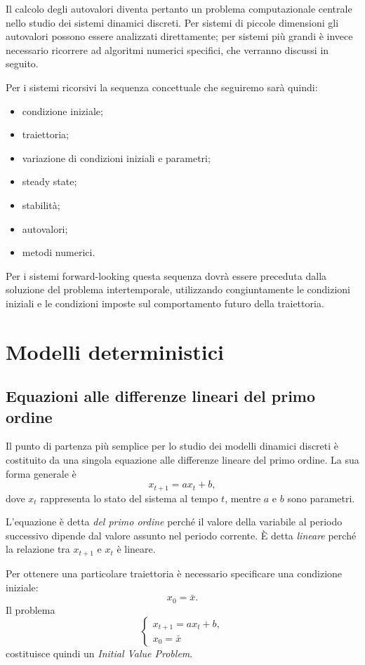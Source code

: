 \documentclass{book}
\begin{document}
Il calcolo degli autovalori diventa pertanto un problema
computazionale centrale nello studio dei sistemi dinamici discreti.
Per sistemi di piccole dimensioni gli autovalori possono essere
analizzati direttamente; per sistemi più grandi è invece necessario
ricorrere ad algoritmi numerici specifici, che verranno discussi in
seguito.

Per i sistemi ricorsivi la sequenza concettuale che seguiremo sarà
quindi:
\begin{itemize}
    \item condizione iniziale;
    \item traiettoria;
    \item variazione di condizioni iniziali e parametri;
    \item steady state;
    \item stabilità;
    \item autovalori;
    \item metodi numerici.
\end{itemize}

Per i sistemi forward-looking questa sequenza dovrà essere preceduta
dalla soluzione del problema intertemporale, utilizzando congiuntamente
le condizioni iniziali e le condizioni imposte sul comportamento futuro
della traiettoria.


\chapter{Modelli deterministici}

\section{Equazioni alle differenze lineari del primo ordine}

Il punto di partenza più semplice per lo studio dei modelli dinamici
discreti è costituito da una singola equazione alle differenze lineare
del primo ordine. La sua forma generale è
\[
x_{t+1}=a x_t+b,
\]
dove $x_t$ rappresenta lo stato del sistema al tempo $t$, mentre $a$ e
$b$ sono parametri.

L'equazione è detta \emph{del primo ordine} perché il valore della
variabile al periodo successivo dipende dal valore assunto nel periodo
corrente. È detta \emph{lineare} perché la relazione tra $x_{t+1}$ e
$x_t$ è lineare.

Per ottenere una particolare traiettoria è necessario specificare una
condizione iniziale:
\[
x_0=\bar{x}.
\]
Il problema
\[
\begin{cases}
x_{t+1}=a x_t+b,\\
x_0=\bar{x}
\end{cases}
\]
costituisce quindi un \emph{Initial Value Problem}.
\end{document}
